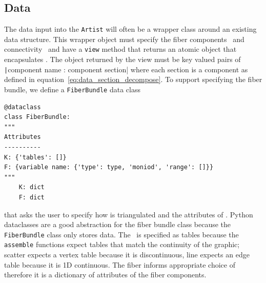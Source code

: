 \documentclass[../main.tex]{subfiles}
\begin{document}
\subsection{Data \dtotal}
\label{sec:code_data}
The data input into the \texttt{Artist} will often be a wrapper class around an existing data structure. This wrapper object must specify the fiber components \dfiber\ and connectivity \dbase\ and have a \texttt{view} method that returns an atomic object that encapsulates \dsection. The object returned by the view must be key valued pairs of \texttt|{component name : component section}| where each section is a component as defined in equation~\ref{eq:data_section_decompose}. To support specifying the fiber bundle, we define a \texttt{FiberBundle} data class\cite{DataclassesDataClasses}

\begin{verbatim}
@dataclass
class FiberBundle:
"""
Attributes
----------
K: {'tables': []}
F: {variable name: {'type': type, 'moniod', 'range': []}}
"""
    K: dict 
    F: dict
\end{verbatim}

that asks the user to specify how \dbase is triangulated and the attributes of \dfiber. Python dataclasses are a good abstraction for the fiber bundle class because the \texttt{FiberBundle} class only stores data. The \dbase\ is specified as tables because the \texttt{assemble} functions expect tables that match the continuity of the graphic; scatter expects a vertex table because it is discontinuous, line expects an edge table because it is 1D continuous. The fiber informs appropriate choice of \vchannel\, therefore it is a dictionary of attributes of the fiber components. 
\end{document}
